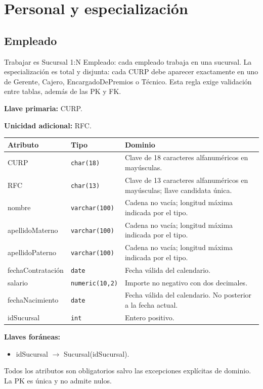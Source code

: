 \section{Personal y especialización}
\par\noindent\begin{minipage}{\textwidth}
\subsection{Empleado}
Trabajar es Sucursal 1:N Empleado: cada empleado trabaja en una sucursal. La especialización es total y disjunta: cada CURP debe aparecer exactamente en uno de Gerente, Cajero, EncargadoDePremios o Técnico. Esta regla exige validación entre tablas, además de las PK y FK.\par
\textbf{Llave primaria:} CURP.\par
\textbf{Unicidad adicional:} RFC.\par
{\small\begin{tabular}{@{}p{}p{}p{}@{}}
\toprule Atributo & Tipo & Dominio \\ \midrule
CURP & \texttt{char(18)} & Clave de 18 caracteres alfanuméricos en mayúsculas. \\
RFC & \texttt{char(13)} & Clave de 13 caracteres alfanuméricos en mayúsculas; llave candidata única. \\
nombre & \texttt{varchar(100)} & Cadena no vacía; longitud máxima indicada por el tipo. \\
apellidoMaterno & \texttt{varchar(100)} & Cadena no vacía; longitud máxima indicada por el tipo. \\
apellidoPaterno & \texttt{varchar(100)} & Cadena no vacía; longitud máxima indicada por el tipo. \\
fechaContratación & \texttt{date} & Fecha válida del calendario. \\
salario & \texttt{numeric(10,2)} & Importe no negativo con dos decimales. \\
fechaNacimiento & \texttt{date} & Fecha válida del calendario. No posterior a la fecha actual. \\
idSucursal & \texttt{int} & Entero positivo. \\
\bottomrule\end{tabular}}
\textbf{Llaves foráneas:}\begin{itemize}[nosep]
\item idSucursal $\rightarrow$ Sucursal(idSucursal).
\end{itemize}
Todos los atributos son obligatorios salvo las excepciones explícitas de dominio. La PK es única y no admite nulos.
\end{minipage}\par\vspace{.35cm}
